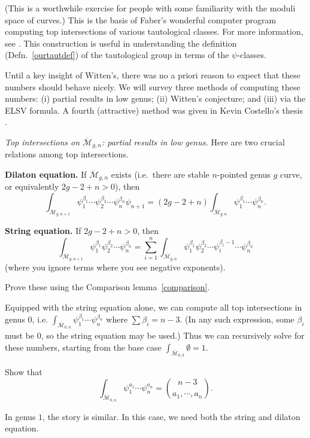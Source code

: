 \documentclass[12pt,letterpaper]{amsart}
\newcommand{\epoint}[1]{\vspace{3mm}\par \noindent \refstepcounter{subsection}{\bf \thesubsection.} 
  {\em #1.} }
\newcommand{\cm}{{\mathcal{M}}}
\newcommand{\cmbar}{\overline{\cm}}
\newcommand{\be}{\beta}
\begin{document}
{(This is a worthwhile exercise for people with some familiarity with
the moduli space of curves.)  
This is the basis of Faber's wonderful computer program \cite{fprog}
computing top intersections of various tautological classes.
For more information, see \cite{falg}.  This construction
is useful in understanding the definition (Defn.\ \ref{ourtautdef}) of
the tautological group in terms of the $\psi$-classes.

Until a key insight of Witten's, there was no a priori reason to
expect that these numbers should behave nicely.  We will survey
three methods of computing these numbers: (i) partial results in low
genus; (ii) Witten's conjecture; and (iii) via the ELSV formula.  A
fourth (attractive) method was given in Kevin Costello's thesis
\cite{costello}.

\epoint{Top intersections on $\cmbar_{g,n}$:  partial results in low
genus}
Here are two crucial relations among top intersections.

\noindent
{\bf Dilaton equation.} If $\cmbar_{g,n}$ exists
(i.e.\ there are stable $n$-pointed genus $g$ curve, or equivalently
$2g-2+n>0$), then
$$\int_{\cmbar_{g,n+1}} \psi_1^{\be_1} \cdots \psi_2^{\be_2}
\cdots \psi_n^{\be_n} \psi_{n+1} = (2g-2+n) \int_{\cmbar_{g,n}} \psi_1^{\be_1}
\cdots \psi_n^{\be_n}.$$ 

\noindent
{\bf String equation.} If $2g-2+n>0$, then 
$$\int_{\cmbar_{g,n+1}} \psi_1^{\be_1} \psi_2^{\be_2}
\cdots \psi_n^{\be_n}  = \sum_{i=1}^n \int_{\cmbar_{g,n}} \psi_1^{\be_1}  \psi_2^{\be_2}
\cdots \psi_i^{\be_i-1} \cdots \psi_n^{\be_n}$$
(where you ignore terms where you see negative exponents).

  Prove these using the
Comparison lemma~\ref{comparison}.

Equipped with the string equation alone, we can compute
all top intersections in genus $0$, i.e.
$\int_{\cmbar_{0,n}} \psi_1^{\be_1} \cdots \psi_n^{\be_n}$
where $\sum \be_i = n-3$.  (In any such expression, some $\be_i$ must
be $0$, so the string equation may be used.)
Thus we can recursively solve for these numbers, starting
from the base case
$\int_{\cmbar_{0,3}} \emptyset = 1$.

Show that $$\int_{\cmbar_{0,n}} \psi_1^{a_1} \cdots \psi_n^{a_n}  = \binom {n-3}
{a_1, \cdots, a_n}.$$

In genus $1$, the story is similar.  In this case, we need both the
string and dilaton equation.

}
\end{document}
